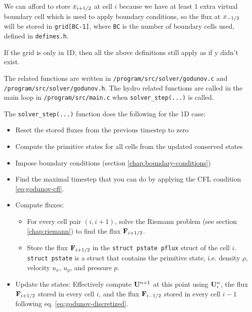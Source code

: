 We can afford to store $x_{i+1/2}$ at cell $i$ because we have at least 1 extra virtual boundary cell which is used to apply boundary conditions, so the flux at $x_{-1/2}$ will be stored in \verb|grid[BC-1]|, where \texttt{BC} is the number of boundary cells used, defined in \texttt{defines.h}.
 

If the grid is only in 1D, then all the above definitions still apply as if y didn't exist.



The related functions are written in \texttt{/program/src/solver/godunov.c} and \texttt{/program/src/solver/godunov.h}.
The hydro related functions are called in the main loop in \texttt{/program/src/main.c} when \verb|solver_step(...)| is called.

The \verb|solver_step(...)| function does the following for the 1D case:
\begin{itemize}
	\item 	Reset the stored fluxes from the previous timestep to zero
	\item 	Compute the primitive states for all cells from the updated conserved states
	\item 	Impose boundary conditions (section \ref{chap:boundary-conditions})
	\item 	Find the maximal timestep that you can do by applying the CFL condition \ref{eq:godunov-cfl}.
	\item 	Compute fluxes:
	\begin{itemize}
		\item 	For every cell pair $(i, i+1)$, solve the Riemann problem (see section \ref{chap:riemann}) to find the flux $\mathbf{F}_{i+1/2}$.
		\item 	Store the flux $\mathbf{F}_{i+1/2}$ in the \texttt{struct pstate pflux} struct of the cell $i$.
				\texttt{struct pstate} is a struct that contains the primitive state, i.e. density $\rho$, velocity $u_x$, $u_y$, and pressure $p$.
	\end{itemize}
	\item 	Update the states: Effectively compute $\mathbf{U}^{n+1}$ at this point using $\mathbf{U}_i^n$, the flux $\mathbf{F}_{i+1/2}$ stored in every cell $i$, and the flux $\mathbf{F}_{i-1/2}$ stored in every cell $i-1$ following eq. \ref{eq:godunov-discretized}.
\end{itemize}








